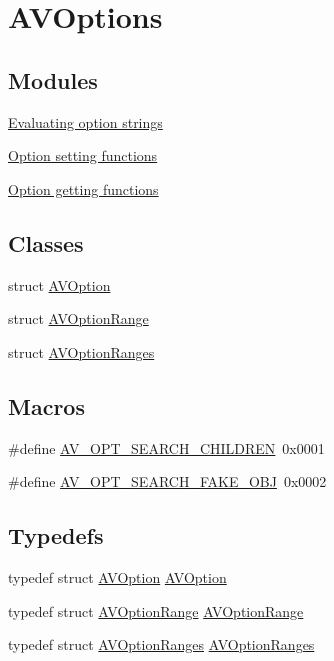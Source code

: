 \hypertarget{group__avoptions}{}\section{A\+V\+Options}
\label{group__avoptions}
\subsection*{Modules}
\begin{DoxyCompactItemize}
\item 
\hyperlink{group__opt__eval__funcs}{Evaluating option strings}
\item 
\hyperlink{group__opt__set__funcs}{Option setting functions}
\item 
\hyperlink{group__opt__get__funcs}{Option getting functions}
\end{DoxyCompactItemize}
\subsection*{Classes}
\begin{DoxyCompactItemize}
\item 
struct \hyperlink{struct_a_v_option}{A\+V\+Option}
\item 
struct \hyperlink{struct_a_v_option_range}{A\+V\+Option\+Range}
\item 
struct \hyperlink{struct_a_v_option_ranges}{A\+V\+Option\+Ranges}
\end{DoxyCompactItemize}
\subsection*{Macros}
\begin{DoxyCompactItemize}
\item 
\#define \hyperlink{group__avoptions_ga25801ba4fc9b5313eb33ec84e082dd72}{A\+V\+\_\+\+O\+P\+T\+\_\+\+S\+E\+A\+R\+C\+H\+\_\+\+C\+H\+I\+L\+D\+R\+EN}~0x0001
\item 
\#define \hyperlink{group__avoptions_gaa764998552a6f6f66a47ecd52b345caa}{A\+V\+\_\+\+O\+P\+T\+\_\+\+S\+E\+A\+R\+C\+H\+\_\+\+F\+A\+K\+E\+\_\+\+O\+BJ}~0x0002
\end{DoxyCompactItemize}
\subsection*{Typedefs}
\begin{DoxyCompactItemize}
\item 
typedef struct \hyperlink{struct_a_v_option}{A\+V\+Option} \hyperlink{group__avoptions_gaa1b952fe722d2259743ba5a35ce47f46}{A\+V\+Option}
\item 
typedef struct \hyperlink{struct_a_v_option_range}{A\+V\+Option\+Range} \hyperlink{group__avoptions_gac8caf68f1d182f6a081ff4336efbeac6}{A\+V\+Option\+Range}
\item 
typedef struct \hyperlink{struct_a_v_option_ranges}{A\+V\+Option\+Ranges} \hyperlink{group__avoptions_gabebd014aa2f58f03966597e280661e17}{A\+V\+Option\+Ranges}
\end{DoxyCompactItemize}
